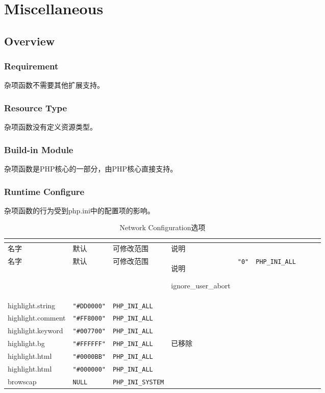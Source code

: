 \part{Miscellaneous}


\chapter{Overview}


\section{Requirement}

杂项函数不需要其他扩展支持。

\section{Resource Type}

杂项函数没有定义资源类型。


\section{Build-in Module}

杂项函数是PHP核心的一部分，由PHP核心直接支持。

\section{Runtime Configure}

杂项函数的行为受到php.ini中的配置项的影响。



\begin{longtable}{|m{100pt}|m{30pt}|m{50pt}|m{100pt}|}
\tabularnewline\hline
名字&默认&可修改范围&说明
\endhead

\caption{Network Configuration选项}\\
\hline
名字&默认&可修改范围&说明
\endfirsthead

\endfoot

\endlastfoot
\hline
ignore\_user\_abort	&\texttt{"0"}			&\texttt{PHP\_INI\_ALL}	& \\
\hline
highlight.string		&\texttt{"\#DD0000"}	&\texttt{PHP\_INI\_ALL} &\\
\hline
highlight.comment		&\texttt{"\#FF8000"}	&\texttt{PHP\_INI\_ALL}	& \\
\hline
highlight.keyword		&\texttt{"\#007700"}	&\texttt{PHP\_INI\_ALL}	& \\
\hline
highlight.bg			&\texttt{"\#FFFFFF"}	&\texttt{PHP\_INI\_ALL}	&已移除\\
\hline
highlight.html			&\texttt{"\#0000BB"}	&\texttt{PHP\_INI\_ALL}	& \\
\hline
highlight.html			&\texttt{"\#000000"}	&\texttt{PHP\_INI\_ALL}	& \\
\hline
browscap			&\texttt{NULL}		&\texttt{PHP\_INI\_SYSTEM}&\\
\hline
\end{longtable}

